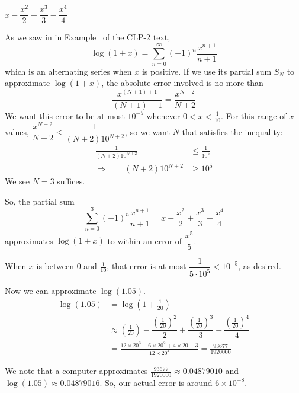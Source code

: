 \begin{answer}
$x-\dfrac{x^2}{2}+\dfrac{x^3}{3}-\dfrac{x^4}{4}$
\end{answer}
\begin{solution}
As we saw in in Example~  of the CLP-2 text,
\[\log(1+ x) = \sum_{n=0}^\infty (-1)^n\frac{x^{n+1}}{n+1}\]
which is an alternating series when $x$ is positive. If we use its partial sum $S_N$ to approximate $\log(1+ x)$, the absolute error involved is no more than
 \[\frac{x^{(N+1)+1}}{(N+1)+1} =\frac{x^{N+2}}{N+2}\]
 We want this error to be at most $10^{-5}$ whenever $0< x <\frac1{10}$. For this range of $x$ values,
$ \dfrac{x^{N+2}}{N+2}<\dfrac{1}{(N+2)10^{N+2}}$, so we want $N$ that satisfies the  inequality:
\begin{align*}
\frac{1}{(N+2)10^{N+2}}&\le \frac{1}{10^5}\\
\Rightarrow \qquad (N+2)10^{N+2}&\ge 10^5
\end{align*}
We see $N=3$ suffices.

So, the partial sum
\[ \sum_{n=0}^3 (-1)^n\frac{x^{n+1}}{n+1}=x-\frac{x^2}{2}+\frac{x^3}{3}-\frac{x^4}{4}\]
approximates $\log(1+x)$ to within an error of
$\dfrac{x^5}{5}$.

When $x$ is between $0$ and $\frac1{10}$,
that error is at most $\dfrac{1}{5\cdot 10^5}<10^{-5}$, as desired.

Now we can approximate $\log(1.05)$.
\begin{align*}
\log(1.05)&=\log\left(1+\frac{1}{20}\right)\\
&\approx \left(\tfrac{1}{20}\right)-\dfrac{\left(\tfrac{1}{20}\right)^2}{2}+\dfrac{\left(\tfrac{1}{20}\right)^3}{3}-\dfrac{\left(\tfrac{1}{20}\right)^4}{4}\\
&=\frac{12\times 20^3-6\times 20^2+4\times 20-3}{12\times 20^4}=\frac{93677}{1920000}
\end{align*}

We note that a computer approximates
$\frac{93677}{1920000}\approx0.04879010$ and
$\log(1.05) \approx 0.04879016$. So, our actual error is around $6\times 10^{-8}$.
\end{solution}

